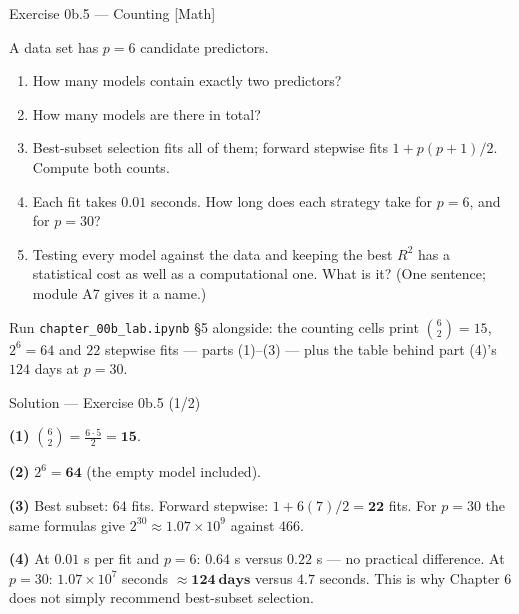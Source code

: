 \documentclass[aspectratio=169,11pt]{beamer}
\begin{document}
\begin{frame}{Exercise 0b.5 --- Counting [Math]}
  \begin{exercise}
    A data set has $p = 6$ candidate predictors.
    \begin{enumerate}
      \item How many models contain exactly two predictors?
      \item How many models are there in total?
      \item Best-subset selection fits all of them; forward stepwise fits
            $1 + p(p+1)/2$. Compute both counts.
      \item Each fit takes $0.01$ seconds. How long does each strategy take
            for $p = 6$, and for $p = 30$?
      \item Testing every model against the data and keeping the best
            $R^2$ has a statistical cost as well as a computational one. What
            is it? (One sentence; module A7 gives it a name.)
    \end{enumerate}
  \end{exercise}
  \begin{labnote}
    Run \texttt{chapter\_00b\_lab.ipynb} \S5 alongside: the counting cells print
    $\binom{6}{2} = 15$, $2^6 = 64$ and $22$ stepwise fits --- parts (1)--(3) ---
    plus the table behind part (4)'s $124$ days at $p = 30$.
  \end{labnote}
\end{frame}

\begin{frame}{Solution --- Exercise 0b.5 (1/2)}
  \begin{solutionbox}
    \textbf{(1)} $\binom{6}{2} = \frac{6 \cdot 5}{2} = \mathbf{15}$.

    \textbf{(2)} $2^6 = \mathbf{64}$ (the empty model included).

    \textbf{(3)} Best subset: $64$ fits. Forward stepwise:
    $1 + 6(7)/2 = \mathbf{22}$ fits. For $p = 30$ the same formulas give
    $2^{30} \approx 1.07\times10^{9}$ against $466$.

    \textbf{(4)} At $0.01$ s per fit and $p = 6$: $0.64$ s versus $0.22$ s ---
    no practical difference. At $p = 30$: $1.07\times10^{7}$ seconds
    $\approx \mathbf{124\ \text{days}}$ versus $4.7$ seconds. This is why
    Chapter 6 does not simply recommend best-subset selection.
  \end{solutionbox}
\end{frame}
\end{document}
